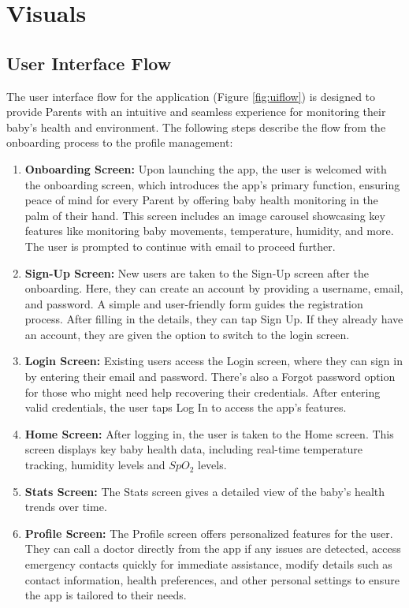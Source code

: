 \documentclass[12pt,a4paper]{report}
\begin{document}
\section{Visuals}
\subsection{User Interface Flow}
The user interface flow for the application (Figure \ref{fig:uiflow}) is designed to provide Parents with an intuitive and seamless experience for monitoring their baby's health and environment. The following steps describe the flow from the onboarding process to the profile management:
\begin{enumerate}
  \item \textbf{Onboarding Screen:} Upon launching the app, the user is welcomed with the onboarding screen, which introduces the app’s primary function, ensuring peace of mind for every Parent by offering baby health monitoring in the palm of their hand. This screen includes an image carousel showcasing key features like monitoring baby movements, temperature, humidity, and more. The user is prompted to continue with email to proceed further.
  \item \textbf{Sign-Up Screen:} New users are taken to the Sign-Up screen after the onboarding. Here, they can create an account by providing a username, email, and password. A simple and user-friendly form guides the registration process. After filling in the details, they can tap Sign Up. If they already have an account, they are given the option to switch to the login screen.
  \item \textbf{Login Screen:} Existing users access the Login screen, where they can sign in by entering their email and password. There’s also a Forgot password option for those who might need help recovering their credentials. After entering valid credentials, the user taps Log In to access the app’s features.
  \item \textbf{Home Screen:} After logging in, the user is taken to the Home screen. This screen displays key baby health data, including real-time temperature tracking, humidity levels and $SpO_2$ levels.
  \item \textbf{Stats Screen:} The Stats screen gives a detailed view of the baby’s health trends over time.
  \item \textbf{Profile Screen:} The Profile screen offers personalized features for the user. They can call a doctor directly from the app if any issues are detected, access emergency contacts quickly for immediate assistance, modify details such as contact information, health preferences, and other personal settings to ensure the app is tailored to their needs.
\end{enumerate}
\end{document}
